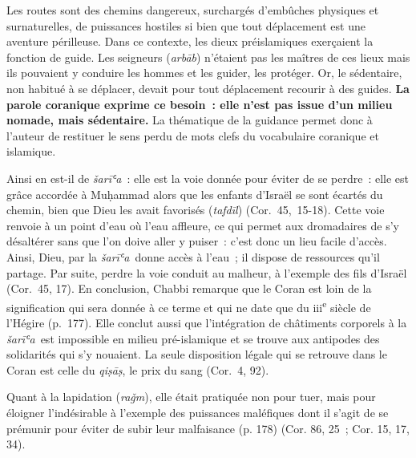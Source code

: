 Les routes sont des chemins dangereux, surchargés d'embûches physiques
et surnaturelles, de puissances hostiles si bien que tout déplacement
est une aventure périlleuse. Dans ce contexte, les dieux préislamiques
exerçaient la fonction de guide. Les seigneurs (\emph{arbāb}) n'étaient
pas les maîtres de ces lieux mais ils pouvaient y conduire les hommes et
les guider, les protéger. Or, le sédentaire, non habitué à se déplacer,
devait pour tout déplacement recourir à des guides. \textbf{La parole
coranique exprime ce besoin~: elle n'est pas issue d'un milieu nomade,
mais sédentaire.} La thématique de la guidance permet donc à l'auteur de
restituer le sens perdu de mots clefs du vocabulaire coranique et
islamique.


Ainsi en est-il de \emph{šarīʿa}~: elle est la voie donnée pour éviter
de se perdre~: elle est grâce accordée à Muḥammad alors que les enfants
d'Israël se sont écartés du chemin, bien que Dieu les avait favorisés
(\emph{tafdīl}) (Cor.~45,~15-18). Cette voie renvoie à un point d'eau où
l'eau affleure, ce qui permet aux dromadaires de s'y désaltérer sans que
l'on doive aller y puiser~: c'est donc un lieu facile d'accès. Ainsi,
Dieu, par la \emph{šarīʿa}~donne accès à l'eau~; il dispose de
ressources qu'il partage. Par suite, perdre la voie conduit au malheur,
à l'exemple des fils d'Israël (Cor.~45, 17). En conclusion, Chabbi
remarque que le Coran est loin de la signification qui sera donnée à ce
terme et qui ne date que du iii\textsuperscript{e} siècle de l'Hégire
(p.~177). Elle conclut aussi que l'intégration de châtiments corporels à
la \emph{šarīʿa}~est impossible en milieu pré-islamique et se trouve aux
antipodes des solidarités qui s'y nouaient. La seule disposition légale
qui se retrouve dans le Coran est celle du \emph{qiṣāṣ}, le prix du sang
(Cor.~4, 92).


Quant à la lapidation (\emph{raǧm}), elle était pratiquée non pour tuer,
mais pour éloigner l'indésirable à l'exemple des puissances maléfiques
dont il s'agit de se prémunir pour éviter de subir leur malfaisance (p.
178) (Cor. 86, 25~; Cor. 15, 17, 34).

